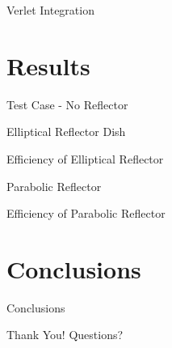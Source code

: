 \documentclass{beamer}
\begin{document}
\begin{frame}{Verlet Integration}
    
\end{frame}

\section{Results}

\begin{frame}{Test Case - No Reflector}
    
\end{frame}

\begin{frame}{Elliptical Reflector Dish}
    
\end{frame}

\begin{frame}{Efficiency of Elliptical Reflector}
    
\end{frame}

\begin{frame}{Parabolic Reflector}
        
\end{frame}

\begin{frame}{Efficiency of Parabolic Reflector}
    
\end{frame}

\section{Conclusions}


\begin{frame}{Conclusions}
    
\end{frame}

\begin{frame}{Thank You!}
    Questions?
\end{frame}
\end{document}
